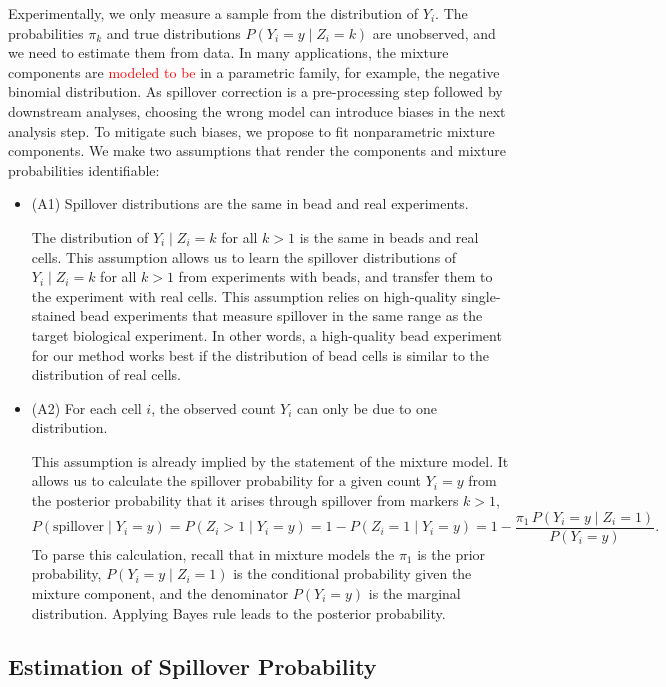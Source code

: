 \documentclass[
]{article}
\begin{document}
Experimentally, we only measure a sample from the distribution of \(Y_i\). The probabilities \(\pi_k\) and true distributions \(P(Y_i = y \mid Z_i = k)\) are unobserved, and we need to estimate them from data.
In many applications, the mixture components are \textcolor{red}{modeled to be} in a parametric family, for example, the negative binomial distribution.
As spillover correction is a pre-processing step followed by downstream analyses, choosing the wrong model can introduce biases in the next analysis step. To mitigate such biases, we propose to fit nonparametric mixture components. We make two assumptions that render the components and mixture probabilities identifiable:

\begin{itemize}
\item
  \label{assumption1}
  (A1) Spillover distributions are the same in bead and real experiments.

  The distribution of \(Y_i \mid Z_i = k\) for all \(k > 1\) is the same in beads and real cells. This assumption allows us to learn the spillover distributions of \(Y_i \mid Z_i = k\) for all \(k > 1\) from experiments with beads, and transfer them to the experiment with real cells. This assumption relies on high-quality single-stained bead experiments that measure spillover in the same range as the target biological experiment. In other words, a high-quality bead experiment for our method works best if the distribution of bead cells is similar to the distribution of real cells.
\item
  \label{assumption2}
  (A2) For each cell \(i\), the observed count \(Y_i\) can only be due to one distribution.

  This assumption is already implied by the statement of the mixture model. It allows us to calculate the spillover probability for a given count \(Y_i = y\) from the posterior probability that it arises through spillover from markers \(k > 1\),
  \[
  P(\text{spillover} \mid Y_i = y) = P(Z_i > 1 \mid Y_i = y) = 
  1 - P(Z_i = 1 \mid Y_i = y) = 
  1 - \frac{\pi_1 \, P(Y_i = y \mid Z_i = 1)}{P(Y_i = y)}.
  \]
  To parse this calculation, recall that in mixture models the \(\pi_1\) is the prior probability, \(P(Y_i = y \mid Z_i = 1)\) is the conditional probability given the mixture component, and the denominator \(P(Y_i = y)\) is the marginal distribution. Applying Bayes rule leads to the posterior probability.
\end{itemize}

\subsection{Estimation of Spillover Probability}\label{estimation-of-spillover-probability}
\end{document}
